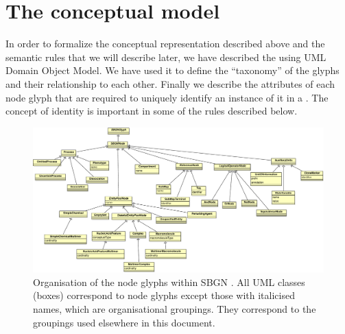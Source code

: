 
\section{The conceptual model}
\label{sec:conceptual-model}

In order to formalize the conceptual representation described above and the semantic rules that we will describe later, we have described the \PDl using UML Domain Object Model. We have used it to define the ``taxonomy'' of the \PD glyphs and their relationship to each other. Finally we describe the attributes of each node glyph that are required to uniquely identify an instance of it in a \PDm. The concept of identity is important in some of the rules described below.

\begin{figure}[htb]
\begin{center}
\includegraphics[width=\linewidth]{images/build/sbgn_node_taxonomy.pdf}
\caption{Organisation of the node glyphs within SBGN \PDl. All UML classes (boxes) correspond to \PD node glyphs except those with italicised names, which are organisational groupings. They correspond to the groupings used elsewhere in this document.}
\label{fig:sbgn_node_tax}
\end{center}
\end{figure}

